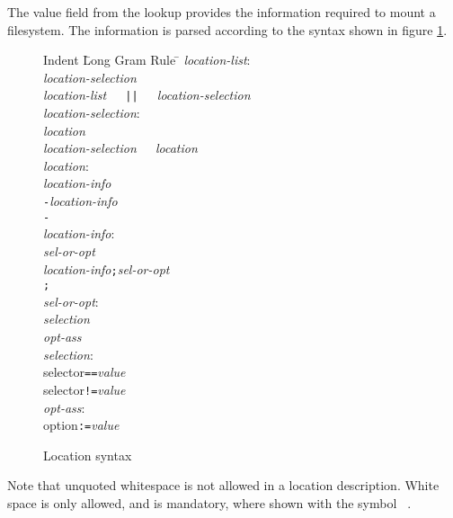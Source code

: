 The value field from the lookup provides the information required to mount a filesystem.
The information is parsed according to the syntax shown in figure \ref{figure:so-grammar}.
\begin{figure}[htb]
\begin{tabbing}
Indent \= Long Gram Rule \= \kill
       \> {\em location-list}:\\
       \>              \> {\em location-selection}\\
       \>              \> {\em location-list}\ \verb*+ +\ {\tt ||}\ \verb*+ +\ {\em location-selection}\\
       \> {\em location-selection}:\\
       \>              \> {\em location}\\
       \>              \> {\em location-selection}\ \verb*+ +\ {\em location}\\
       \> {\em location}:\\
       \>              \> {\em location-info}\\
       \>              \> {\tt -}{\em location-info}\\
       \>              \> {\tt -}\\
       \> {\em location-info}:\\
       \>              \> {\em sel-or-opt}\\
       \>              \> {\em location-info}{\tt ;}{\em sel-or-opt}\\
       \>              \> {\tt ;}\\
       \> {\em sel-or-opt}:\\
       \>              \> {\em selection}\\
       \>              \> {\em opt-ass}\\
       \> {\em selection}:\\
       \>              \> {\rm selector}{\tt ==}{\em value}\\
       \>              \> {\rm selector}{\tt !=}{\em value}\\
       \> {\em opt-ass}:\\
       \>              \> {\rm option}{\tt :=}{\em value}\\
\end{tabbing}
\caption{\label{figure:so-grammar}Location syntax}
\end{figure}
Note that unquoted whitespace is not allowed in a location description.
White space is only allowed, and is mandatory, where shown with the symbol \verb*+ +.

